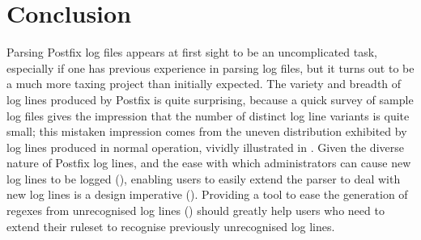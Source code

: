 \chapter{Conclusion}

\label{conclusion}

Parsing Postfix log files appears at first sight to be an uncomplicated
task, especially if one has previous experience in parsing log files, but
it turns out to be a much more taxing project than initially expected.  The
variety and breadth of log lines produced by Postfix is quite surprising,
because a quick survey of sample log files gives the impression that the
number of distinct log line variants is quite small; this mistaken
impression comes from the uneven distribution exhibited by log lines
produced in normal operation, vividly illustrated in .  Given the diverse nature of Postfix log lines, and the ease with
which administrators can cause new log lines to be logged
(), enabling users to easily extend the
parser to deal with new log lines is a design imperative
().  Providing a tool to ease the generation of
regexes from unrecognised log lines () should greatly help users who need to extend their ruleset
to recognise previously unrecognised log lines.


